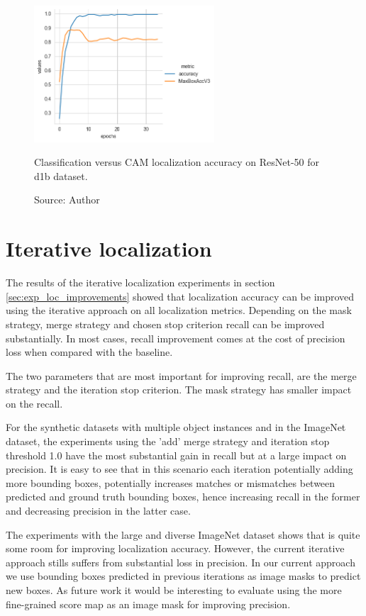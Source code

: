 \begin{figure}[ht]
\begin{center}
    \includegraphics[width=0.6\textwidth]{images/fig_loc_vs_acc_resnet50_cam_d1b.png}
    \caption[Classification versus CAM localization accuracy on ResNet-50 for d1b dataset]{Classification versus CAM localization accuracy on ResNet-50 for d1b dataset.}
    \caption*{Source: Author}
    \label{fig:loc_vs_acc_resnet50_cam_d1b}
\end{center}
\end{figure}

\section{Iterative localization} \label{dis:iterative_localizaiton}
The results of the iterative localization experiments in section \ref{sec:exp_loc_improvements} showed that localization accuracy can be improved using the iterative approach on all localization metrics. Depending on the mask strategy, merge strategy and chosen stop criterion recall can be improved substantially. In most cases, recall improvement comes at the cost of precision loss when compared with the baseline.

The two parameters that are most important for improving recall, are the merge strategy and the iteration stop criterion. The mask strategy has smaller impact on the recall. 

For the synthetic datasets with multiple object instances and in the ImageNet dataset, the experiments using the 'add' merge strategy and iteration stop threshold 1.0 have the most substantial gain in recall but at a large impact on precision. It is easy to see that in this scenario each iteration potentially adding more bounding boxes, potentially increases matches  or mismatches between predicted and ground truth bounding boxes, hence increasing recall in the former and decreasing precision in the latter case.

The experiments with the large and diverse ImageNet dataset shows that is quite some room for improving localization accuracy. However, the current iterative approach stills suffers from substantial loss in precision. In our current approach we use bounding boxes predicted in previous iterations as image masks to predict new boxes. As future work it would be interesting to evaluate using the more fine-grained score map as an image mask for improving precision.